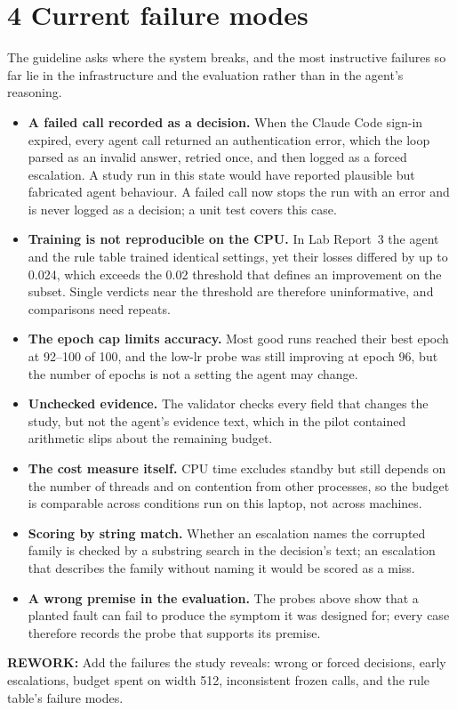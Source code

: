 \documentclass[11pt]{article}
\newcommand{\rework}[1]{\noindent\colorbox{yellow!40}{\parbox{\dimexpr\linewidth-2\fboxsep}{%
  \small\textbf{REWORK:} #1}}\par}
\begin{document}
\section*{4 \quad Current failure modes}
The guideline asks where the system breaks, and the most instructive failures so far lie in the
infrastructure and the evaluation rather than in the agent's reasoning.
\begin{itemize}
\item \textbf{A failed call recorded as a decision.} When the Claude Code sign-in expired, every
  agent call returned an authentication error, which the loop parsed as an invalid answer, retried
  once, and then logged as a forced escalation. A study run in this state would have reported
  plausible but fabricated agent behaviour. A failed call now stops the run with an error and is
  never logged as a decision; a unit test covers this case.
\item \textbf{Training is not reproducible on the CPU.} In Lab Report~3 the agent and the rule
  table trained identical settings, yet their losses differed by up to 0.024, which exceeds the
  0.02 threshold that defines an improvement on the subset. Single verdicts near the threshold
  are therefore uninformative, and comparisons need repeats.
\item \textbf{The epoch cap limits accuracy.} Most good runs reached their best epoch at 92--100
  of 100, and the low-lr probe was still improving at epoch 96, but the number of epochs is not
  a setting the agent may change.
\item \textbf{Unchecked evidence.} The validator checks every field that changes the study, but
  not the agent's evidence text, which in the pilot contained arithmetic slips about the
  remaining budget.
\item \textbf{The cost measure itself.} CPU time excludes standby but still depends on the number
  of threads and on contention from other processes, so the budget is comparable across
  conditions run on this laptop, not across machines.
\item \textbf{Scoring by string match.} Whether an escalation names the corrupted family is
  checked by a substring search in the decision's text; an escalation that describes the family
  without naming it would be scored as a miss.
\item \textbf{A wrong premise in the evaluation.} The probes above show that a planted fault can
  fail to produce the symptom it was designed for; every case therefore records the probe that
  supports its premise.
\end{itemize}
\rework{Add the failures the study reveals: wrong or forced decisions, early escalations,
budget spent on width 512, inconsistent frozen calls, and the rule table's failure modes.}
\end{document}
